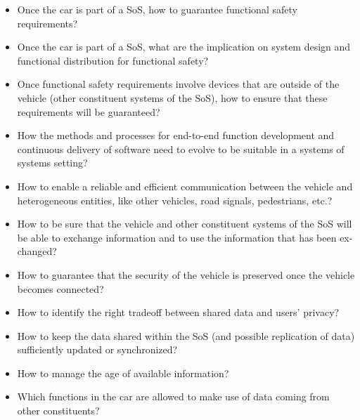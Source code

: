 \begin{itemize}
\item Once the car is part of a SoS, how to guarantee functional safety requirements?
\item Once the car is part of a SoS, what are the implication on system design and functional distribution for functional safety?
\item Once functional safety requirements involve devices that are outside of the vehicle (other constituent systems of the SoS), how to ensure that these requirements will be guaranteed?
\item How the methods and processes for end-to-end function development and continuous delivery of software need to evolve to be suitable in a systems of systems setting?
\item How to enable a reliable and efficient communication between the vehicle and heterogeneous entities, like other vehicles, road signals, pedestrians, etc.?
\item How to be sure that the vehicle and other constituent systems of the SoS will be able to exchange information and to use the information that has been ex-changed?
\item How to guarantee that the security of the vehicle is preserved once the vehicle becomes connected?
\item How to identify the right tradeoff between shared data and users' privacy?
\item How to keep the data shared within the SoS (and possible replication of data) sufficiently updated or synchronized?
\item How to manage the age of available information?
\item Which functions in the car are allowed to make use of data coming from other constituents?
\end{itemize}




